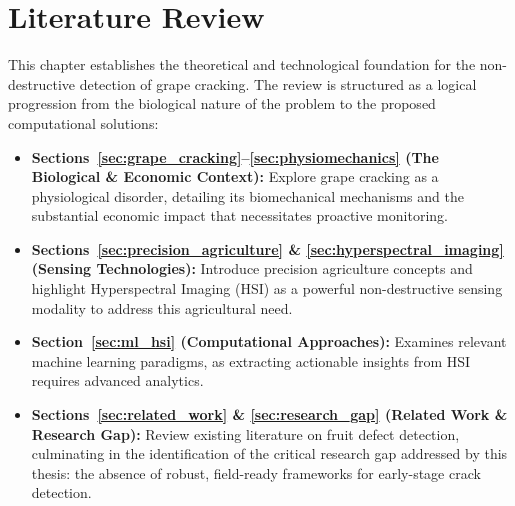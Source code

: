 %


\chapter{Literature Review}

This chapter establishes the theoretical and technological foundation for the non-destructive detection of grape cracking. The review is structured as a logical progression from the biological nature of the problem to the proposed computational solutions:

\begin{itemize}
  \item \textbf{Sections~\ref{sec:grape_cracking}--\ref{sec:physiomechanics} (The Biological \& Economic Context):} Explore grape cracking as a physiological disorder, detailing its biomechanical mechanisms and the substantial economic impact that necessitates proactive monitoring.
  \item \textbf{Sections~\ref{sec:precision_agriculture} \& \ref{sec:hyperspectral_imaging} (Sensing Technologies):} Introduce precision agriculture concepts and highlight Hyperspectral Imaging (HSI) as a powerful non-destructive sensing modality to address this agricultural need.
  \item \textbf{Section~\ref{sec:ml_hsi} (Computational Approaches):} Examines relevant machine learning paradigms, as extracting actionable insights from HSI requires advanced analytics.
  \item \textbf{Sections~\ref{sec:related_work} \& \ref{sec:research_gap} (Related Work \& Research Gap):} Review existing literature on fruit defect detection, culminating in the identification of the critical research gap addressed by this thesis: the absence of robust, field-ready frameworks for early-stage crack detection.
\end{itemize}

